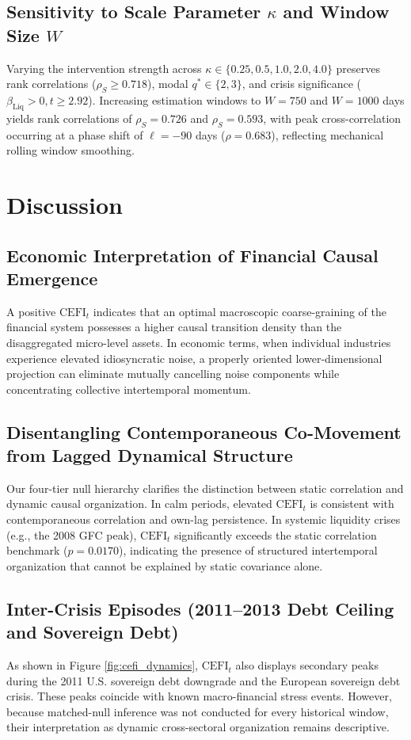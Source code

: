 \documentclass[review,12pt,authoryear]{elsarticle}
\begin{document}
\subsection{Sensitivity to Scale Parameter \texorpdfstring{$\kappa$}{kappa} and Window Size \texorpdfstring{$W$}{W}}
Varying the intervention strength across $\kappa \in \{0.25, 0.5, 1.0, 2.0, 4.0\}$ preserves rank correlations ($\rho_S \ge 0.718$), modal $q^* \in \{2, 3\}$, and crisis significance ($\beta_{\text{Liq}} > 0, t \ge 2.92$). Increasing estimation windows to $W = 750$ and $W = 1000$ days yields rank correlations of $\rho_S = 0.726$ and $\rho_S = 0.593$, with peak cross-correlation occurring at a phase shift of $\ell = -90$ days ($\rho = 0.683$), reflecting mechanical rolling window smoothing.

\section{Discussion}
\label{sec:discussion}

\subsection{Economic Interpretation of Financial Causal Emergence}
A positive $\mathrm{CEFI}_t$ indicates that an optimal macroscopic coarse-graining of the financial system possesses a higher causal transition density than the disaggregated micro-level assets. In economic terms, when individual industries experience elevated idiosyncratic noise, a properly oriented lower-dimensional projection can eliminate mutually cancelling noise components while concentrating collective intertemporal momentum.

\subsection{Disentangling Contemporaneous Co-Movement from Lagged Dynamical Structure}
Our four-tier null hierarchy clarifies the distinction between static correlation and dynamic causal organization. In calm periods, elevated $\mathrm{CEFI}_t$ is consistent with contemporaneous correlation and own-lag persistence. In systemic liquidity crises (e.g., the 2008 GFC peak), $\mathrm{CEFI}_t$ significantly exceeds the static correlation benchmark ($p = 0.0170$), indicating the presence of structured intertemporal organization that cannot be explained by static covariance alone.

\subsection{Inter-Crisis Episodes (2011--2013 Debt Ceiling and Sovereign Debt)}
As shown in Figure \ref{fig:cefi_dynamics}, $\mathrm{CEFI}_t$ also displays secondary peaks during the 2011 U.S. sovereign debt downgrade and the European sovereign debt crisis. These peaks coincide with known macro-financial stress events. However, because matched-null inference was not conducted for every historical window, their interpretation as dynamic cross-sectoral organization remains descriptive.
\end{document}
